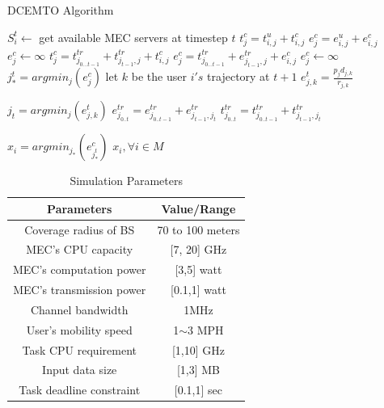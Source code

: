 \documentclass[conference]{IEEEtran}
\begin{document}
 \begin{algorithm}
 \caption{DCEMTO Algorithm}
 \begin{algorithmic}[1]
 \renewcommand{\algorithmicrequire}{\textbf{Input: mobile users $N$, base stations $M$}}
 \renewcommand{\algorithmicensure}{\textbf{Output: $x_i ,\forall i \in M$}}
 \REQUIRE 
 \ENSURE  

  \STATE $S_i^t \mathrm{\leftarrow }$ get available MEC servers at timestep $t$
  \STATE $t^c_j=t^u_{i,j}+t^c_{i,j}$
  \STATE $e^c_j=e^u_{i,j}+e^c_{i,j}$
  \ELSE
  \STATE $e^c_j \mathrm{\leftarrow } \mathrm{\infty }$
  \ENDIF
  \ELSE
  \STATE $t^c_j=t^{tr}_{j_{0\dots t-1}}+t^{tr}_{j_{t-1},j}+t^c_{i,j}$
  \STATE $e^c_j=t^{tr}_{j_{0\dots t-1}}+e^{tr}_{j_{t-1},j}+e^c_{i,j}$
  \ELSE
  \STATE $e^c_j \mathrm{\leftarrow } \mathrm{\infty }$
  \ENDIF
  \ENDIF
  \ENDFOR
  \STATE $j^t_*=argmin_j(e^c_j)$
  \STATE let $k$ be the user $i's$ trajectory at $t+1$
  \STATE $e^t_{j,k}=\frac{p_jd_{j,k}}{r_{j,k}}$
  \ENDFOR
  
  \STATE $j_t=argmin_j(e^t_{j,k})$
  \STATE $ e^{tr}_{j_{0..t}}=e^{tr}_{j_{0..t-1}}+e^{tr}_{j_{t-1},j_t}$
  \STATE $t^{tr}_{j_{0..t}}=t^{tr}_{j_{0..t-1}}+t^{tr}_{j_{t-1},j_t}$
 
  \ENDFOR
  \STATE $x_i=argmin_{j_*}(e^c_{j^t_*})$
  \ENDFOR
 \RETURN $x_i ,\forall i \in M$ 
 \end{algorithmic} 
 \end{algorithm}
 
 
\begin{table}
\caption{Simulation Parameters}
\begin{center}
\begin{tabular}{|c|c|}
\hline
\textbf{Parameters}&\textbf{Value/Range}\\
\hline
Coverage radius of BS & 70 to 100 meters  \\
\hline
MEC’s CPU capacity & [7, 20] GHz \\
\hline
MEC’s computation power  & [3,5] watt \\
\hline
MEC’s transmission power & [0.1,1] watt \\
\hline
Channel bandwidth & 1MHz \\
\hline
User’s mobility speed & 1$\mathrm{\sim}$3 MPH \\
\hline
Task CPU requirement & [1,10] GHz \\
\hline
Input data size & [1,3] MB \\
\hline
Task deadline constraint & [0.1,1] sec \\
\hline
\end{tabular}
\label{table.2}
\end{center}
\end{table}
 
\end{document}
